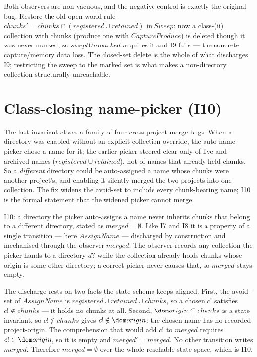 \documentclass[a4paper]{article}
\begin{document}
Both observers are non-vacuous, and the negative control is exactly the original
bug.  Restore the old open-world rule $chunks' = chunks \cap (registered \cup
retained)$ in $Sweep$: now a class-(ii) collection with chunks (produce one with
$CaptureProduce$) is deleted though it was never marked, so $sweptUnmarked$
acquires it and I9 fails --- the concrete capture/memory data loss.  The
closed-set delete is the whole of what discharges I9; restricting the sweep to
the marked set is what makes a non-directory collection structurally unreachable.

\section{Class-closing name-picker (I10)}

The last invariant closes a family of four cross-project-merge bugs.  When a
directory was enabled without an explicit collection override, the auto-name
picker chose a name for it; the earlier picker steered clear only of live and
archived names ($registered \cup retained$), not of names that already held
chunks.  So a \textit{different} directory could be auto-assigned a name whose
chunks were another project's, and enabling it silently merged the two projects
into one collection.  The fix widens the avoid-set to include every chunk-bearing
name; I10 is the formal statement that the widened picker cannot merge.

I10: a directory the picker auto-assigns a name never inherits chunks that belong
to a different directory, stated as $merged = \emptyset$.  Like I7 and I8 it is a
property of a single transition --- here $AssignName$ --- discharged by
construction and mechanised through the observer $merged$.  The observer records
any collection the picker hands to a directory $d?$ while the collection already
holds chunks whose origin is some other directory; a correct picker never causes
that, so $merged$ stays empty.

The discharge rests on two facts the state schema keeps aligned.  First, the
avoid-set of $AssignName$ is $registered \cup retained \cup chunks$, so a chosen
$c!$ satisfies $c! \notin chunks$ --- it holds no chunks at all.  Second, $\dom
origin \subseteq chunks$ is a state invariant, so $c! \notin chunks$ gives $c!
\notin \dom origin$: the chosen name has no recorded project-origin.  The
comprehension that would add $c!$ to $merged$ requires $c! \in \dom origin$, so it
is empty and $merged' = merged$.  No other transition writes $merged$.  Therefore
$merged = \emptyset$ over the whole reachable state space, which is I10.
\end{document}
